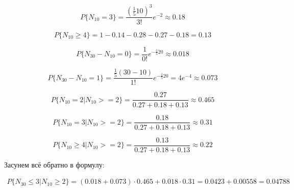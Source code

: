 \documentclass[a4paper,12pt]{article}
\begin{document}
\[ P\{N_{10} = 3 \} = \frac{(\frac{1}{5} 10)^3}{3!} e^{-2}  \approx 0.18\]

\[ P\{N_{10} \ge 4 \} =1 -0.14 -0.28 - 0.27 - 0.18 =0.13 \]



\[ P\{ N_{30} - N_{10} = 0 \} = \frac{1}{0!} e^{-\frac{1}{5}20} \approx 0.018\]

\[ P\{ N_{30} - N_{10} = 1 \} = \frac{\frac{1}{5}(30-10)}{1!} e^{-\frac{1}{5}20} = 4 e^{-4} \approx 0.073\]

\[ P\{ N_{10} = 2 | N_{10} >= 2\} = \frac{0.27}{0.27 + 0.18 + 0.13} \approx 0.465 \]

\[ P\{ N_{10} = 3 | N_{10} >= 2\} = \frac{0.18}{0.27 + 0.18 + 0.13} \approx 0.31 \]

\[ P\{ N_{10} \ge 4 | N_{10} >= 2\} = \frac{0.13}{0.27 + 0.18 + 0.13} \approx 0.22 \]


Засунем всё обратно в формулу:

\begin{equation}
\begin{aligned}
P\{ N_{30} \le 3 | N_{10} \ge 2 \}  = (0.018 + 0.073) \cdot 0.465 + 0.018 \cdot 0.31 = 0.0423 + 0.00558 = 0.04788
\end{aligned}
\end{equation}
\end{document}
